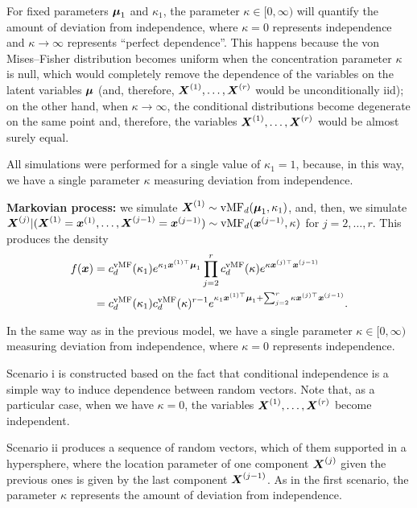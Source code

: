 \documentclass[oneside,11pt]{article}
\begin{document}
    For fixed parameters $\boldsymbol\mu_1$ and $\kappa_1$, the parameter $\kappa \in [0,\infty)$ will quantify the amount of deviation from independence, where $\kappa=0$ represents independence and $\kappa \to \infty$ represents ``perfect dependence''. This happens because the von Mises--Fisher distribution becomes uniform when the concentration parameter $\kappa$ is null, which would completely remove the dependence of the variables on the latent variables $\boldsymbol\mu$ (and, therefore, $\boldsymbol{X}^{(1)}, \dots, \boldsymbol{X}^{(r)}$ would be unconditionally iid); on the other hand, when $\kappa \to \infty$, the conditional distributions become degenerate on the same point and, therefore, the variables $\boldsymbol{X}^{(1)}, \dots, \boldsymbol{X}^{(r)}$ would be almost surely equal.

    All simulations were performed for a single value of $\kappa_1 = 1$, because, in this way, we have a single parameter $\kappa$ measuring deviation from independence.
    
\textbf{Markovian process:} we simulate $\boldsymbol{X}^{(1)} \sim \mathrm{vMF}_d (\boldsymbol\mu_1, \kappa_1)$, and, then, we simulate $\boldsymbol{X}^{(j)} | (\boldsymbol{X}^{(1)} = \boldsymbol{x}^{(1)} , \dots, \boldsymbol{X}^{(j-1)} = \boldsymbol{x}^{(j-1)}) \sim \mathrm{vMF}_d (\boldsymbol{x}^{(j-1)}, \kappa)$ for $j = 2, \dots, r$. This produces the density
    \begin{align*}
        f(\boldsymbol{x}) &= c^\mathrm{vMF}_{d}(\kappa_1) e^{\kappa_1\boldsymbol{x}^{(1) \top}\boldsymbol\mu_1} \prod_{j=2}^{r} c^\mathrm{vMF}_{d}(\kappa) e^{\kappa\boldsymbol{x}^{(j) \top}\boldsymbol{x}^{(j-1)}} \\
        &= c^\mathrm{vMF}_{d}(\kappa_1) c^\mathrm{vMF}_{d}(\kappa)^{r-1} e^{\kappa_1\boldsymbol{x}^{(1) \top}\boldsymbol\mu_1 + \sum_{j=2}^{r} \kappa\boldsymbol{x}^{(j) \top}\boldsymbol{x}^{(j-1)}}.
\end{align*}

    In the same way as in the previous model, we have a single parameter $\kappa \in [0,\infty)$ measuring deviation from independence, where $\kappa=0$ represents independence.

Scenario i is constructed based on the fact that conditional independence is a simple way to induce dependence between random vectors. Note that, as a particular case, when we have $\kappa=0$, the variables $\boldsymbol{X}^{(1)}, \dots, \boldsymbol{X}^{(r)}$ become independent.

Scenario ii produces a sequence of random vectors, which of them supported in a hypersphere, where the location parameter of one component $\boldsymbol{X}^{(j)}$ given the previous ones is given by the last component $\boldsymbol{X}^{(j-1)}$. As in the first scenario, the parameter $\kappa$ represents the amount of deviation from independence.
\end{document}
